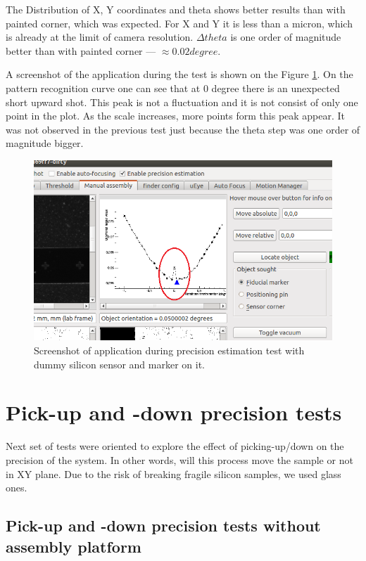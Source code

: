 The Distribution of X, Y coordinates and theta shows better results than with painted corner, which was expected. For X and Y it is less than a micron, which is already at the limit of camera resolution. $\Delta theta$ is one order of magnitude better than with painted corner --- $\approx 0.02  degree$.

A screenshot of the application during the test is shown on the Figure \ref{fig:zero_peak}. On the pattern recognition curve one can see that at 0 degree there is an unexpected short upward shot. This peak is not a fluctuation and it is not consist of only one point in the plot. As the scale increases, more points form this peak appear. It was not observed in the previous test just because the theta step was one order of magnitude bigger.

\begin{figure}[ht]\centering
\includegraphics[width=0.8\linewidth]{Data/Precision_tests/Upward_shot.png}
\caption{Screenshot of application during precision estimation test with dummy silicon sensor and marker on it.}
\label{fig:zero_peak}
\end{figure}

\section{Pick-up and -down precision tests}

Next set of tests were oriented to explore the effect of picking-up/down on the precision of the system. In other words, will this process move the sample or not in XY plane. Due to the risk of breaking fragile silicon samples, we used glass ones.

\subsection{Pick-up and -down precision tests without assembly platform}

